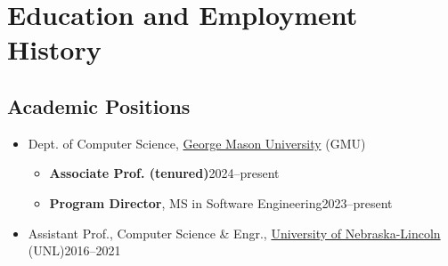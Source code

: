 \documentclass[11pt]{article}
\begin{document}


\section{Education and Employment History}
\subsection{Academic Positions}

\begin{itemize}
    \item Dept. of Computer Science, \href{https://cs.gmu.edu}{George Mason University} (GMU)
    \begin{itemize}
        \item \textbf{Associate Prof. (tenured)}\hfill 2024--present
        \item \textbf{Program Director}, MS in Software Engineering\hfill 2023--present
        
    \end{itemize}
    
    \item Assistant Prof., Computer Science \& Engr., \href{https://computing.unl.edu}{University of Nebraska-Lincoln} (UNL)\hfill 2016--2021
    

\end{itemize}
\end{document}
